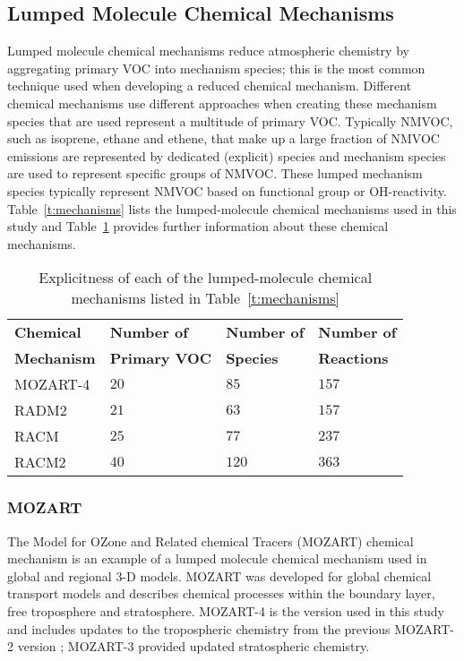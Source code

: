 \subsection{Lumped Molecule Chemical Mechanisms} \label{ss:lumped_molecule}
Lumped molecule chemical mechanisms reduce atmospheric chemistry by aggregating primary VOC into mechanism species; this is the most common technique used when developing a reduced chemical mechanism.
Different chemical mechanisms use different approaches when creating these mechanism species that are used represent a multitude of primary VOC.
Typically NMVOC, such as isoprene, ethane and ethene, that make up a large fraction of NMVOC emissions are represented by dedicated (explicit) species and mechanism species are used to represent specific groups of NMVOC.
These lumped mechanism species typically represent NMVOC based on functional group or OH-reactivity.
Table~\ref{t:mechanisms} lists the lumped-molecule chemical mechanisms used in this study and Table~\ref{t:lumped_molecule} provides further information about these chemical mechanisms.
\begin{table}
    \centering
    \caption{Explicitness of each of the lumped-molecule chemical mechanisms listed in Table~\ref{t:mechanisms}}
    \label{t:lumped_molecule}
    \begin{tabular}{llll}
        \hline \hline
        \textbf{Chemical} & \textbf{Number of} & \textbf{Number of} & \textbf{Number of} \\
        \textbf{Mechanism} & \textbf{Primary VOC} & \textbf{Species} & \textbf{Reactions} \\
        \hline \hline
        MOZART-4 & $20$ & $85$ & $157$ \\
        RADM2 & $21$ & $63$ & $157$ \\
        RACM & $25$ & $77$ & $237$ \\
        RACM2 & $40$ & $120$ & $363$ \\
        \hline \hline
    \end{tabular}
\end{table}

\subsubsection{MOZART}
The Model for OZone and Related chemical Tracers (MOZART) chemical mechanism is an example of a lumped molecule chemical mechanism used in global and regional 3-D models.
MOZART was developed for global chemical transport models and describes chemical processes within the boundary layer, free troposphere and stratosphere.
MOZART-4 \citep{Emmons:2010} is the version used in this study and includes updates to the tropospheric chemistry from the previous MOZART-2 version \citep{Horowitz:2003}; MOZART-3 \citep{Kinnison:2007} provided updated stratospheric chemistry.

